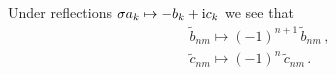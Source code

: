 \documentclass[aip,cha,showpacs,reprint]{revtex4-1} %
\begin{document}
Under reflections $\sigma a_k \mapsto-b_k+\mathrm{i} c_k$ we see that
\bseq\label{eq:SO2chebRefl}
 \begin{align}
  \tilde{b}_{nm} \mapsto (-1)^{n+1}\, \tilde{b}_{nm}\,,\\
  \tilde{c}_{nm} \mapsto (-1)^{n}\, \tilde{c}_{nm}\,.
 \end{align}
\eseq
%


\end{document}
